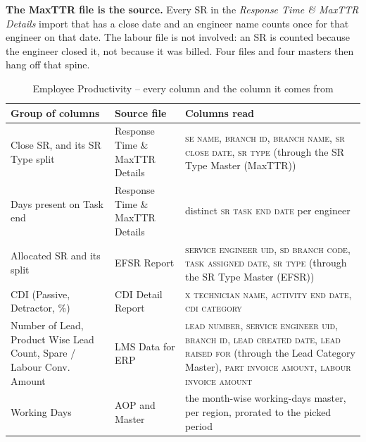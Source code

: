 \documentclass[11pt,a4paper]{article}
\newcommand{\col}[1]{\textsc{\small #1}}
\begin{document}
\textbf{The MaxTTR file is the source.} Every SR in the \emph{Response Time \& MaxTTR
Details} import that has a close date and an engineer name counts once for that engineer
on that date. The labour file is not involved: an SR is counted because the engineer
closed it, not because it was billed. Four files and four masters then hang off that
spine.

\begin{table}[H]\centering\small
\begin{tabularx}{\linewidth}{@{}p{3.1cm}p{4.3cm}X@{}}
\toprule
\textbf{Group of columns} & \textbf{Source file} & \textbf{Columns read} \\
\midrule
Close SR, and its SR Type split &
Response Time \& MaxTTR Details &
\col{se name}, \col{branch id}, \col{branch name}, \col{sr close date}, \col{sr type}
(through the SR Type Master (MaxTTR)) \\
\addlinespace
Days present on Task end &
Response Time \& MaxTTR Details &
distinct \col{sr task end date} per engineer \\
\addlinespace
Allocated SR and its split &
EFSR Report &
\col{service engineer uid}, \col{sd branch code}, \col{task assigned date},
\col{sr type} (through the SR Type Master (EFSR)) \\
\addlinespace
CDI (Passive, Detractor, \%) &
CDI Detail Report &
\col{x technician name}, \col{activity end date}, \col{cdi category} \\
\addlinespace
Number of Lead, Product Wise Lead Count, Spare / Labour Conv. Amount &
LMS Data for ERP &
\col{lead number}, \col{service engineer uid}, \col{branch id},
\col{lead created date}, \col{lead raised for} (through the Lead Category Master),
\col{part invoice amount}, \col{labour invoice amount} \\
\addlinespace
Working Days &
AOP and Master &
the month-wise working-days master, per region, prorated to the picked period \\
\bottomrule
\end{tabularx}
\caption{Employee Productivity -- every column and the column it comes from}
\end{table}
\end{document}

